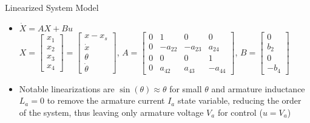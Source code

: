 \documentclass{beamer}
\begin{document}
\begin{frame}{Linearized System Model}
\begin{itemize}
\pause \item $\dot{X}=AX+Bu$ \\ \pause $X=\left[ \begin{array}{c} x_1 \\ x_{2} \\ x_3 \\ x_{4} \end{array} \right]=\left[ \begin{array}{cccc} x-x_s \\ \dot{x} \\ \theta \\ \dot{\theta} \end{array} \right]$, \pause $A=\left[ \begin{array}{cccc} 0 & 1 & 0 & 0 \\ 0 & -a_{22} & -a_{23} & a_{24} \\ 0 & 0 & 0 & 1 \\ 0 & a_{42} & a_{43} & -a_{44} \end{array} \right]$, \pause $B=\left[ \begin{array}{c} 0 \\ b_{2} \\ 0 \\ -b_{4} \end{array} \right]$
\pause \item Notable linearizations are $\sin\left(\theta\right)\approx\theta$ for small $\theta$ and armature inductance $L_a=0$ to remove the armature current $I_a$ state variable, reducing the order of the system, thus leaving only armature voltage $V_a$ for control ($u=V_a$)
\end{itemize}

\end{frame}
\end{document}

